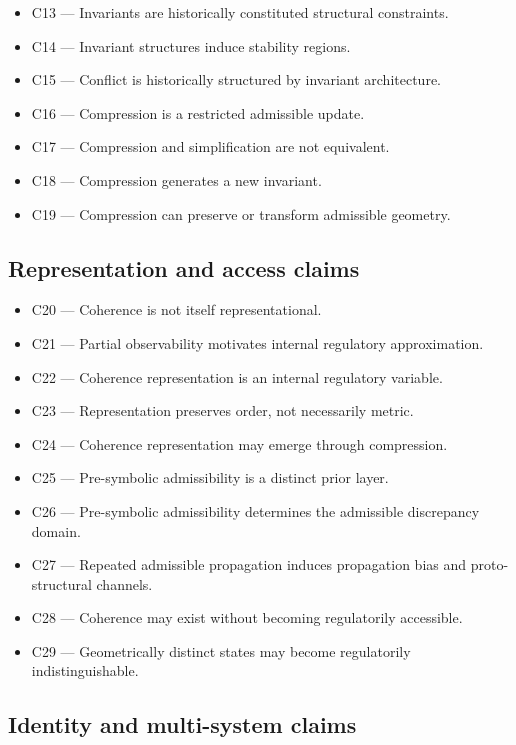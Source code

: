 \documentclass[11pt,a4paper]{article}
\begin{document}
	\begin{itemize}[leftmargin=2em]
		\item C13 --- Invariants are historically constituted structural constraints.
		\item C14 --- Invariant structures induce stability regions.
		\item C15 --- Conflict is historically structured by invariant architecture.
		\item C16 --- Compression is a restricted admissible update.
		\item C17 --- Compression and simplification are not equivalent.
		\item C18 --- Compression generates a new invariant.
		\item C19 --- Compression can preserve or transform admissible geometry.
	\end{itemize}
	
	\subsection{Representation and access claims}
	
	\begin{itemize}[leftmargin=2em]
		\item C20 --- Coherence is not itself representational.
		\item C21 --- Partial observability motivates internal regulatory approximation.
		\item C22 --- Coherence representation is an internal regulatory variable.
		\item C23 --- Representation preserves order, not necessarily metric.
		\item C24 --- Coherence representation may emerge through compression.
		\item C25 --- Pre-symbolic admissibility is a distinct prior layer.
		\item C26 --- Pre-symbolic admissibility determines the admissible discrepancy domain.
		\item C27 --- Repeated admissible propagation induces propagation bias and proto-structural channels.
		\item C28 --- Coherence may exist without becoming regulatorily accessible.
		\item C29 --- Geometrically distinct states may become regulatorily indistinguishable.
	\end{itemize}
	
	\subsection{Identity and multi-system claims}
	
\end{document}
